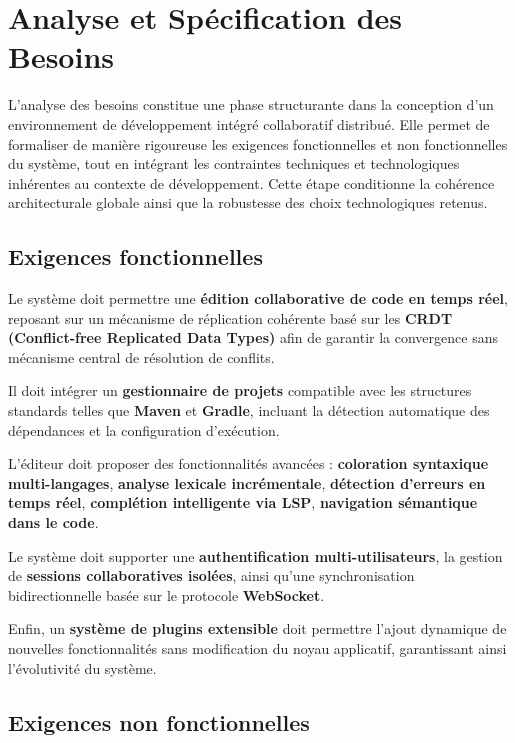 \documentclass[a4paper,oneside,12pt]{book}
\begin{document}
\chapter{\textbf{Analyse et Spécification des Besoins}}

L’analyse des besoins constitue une phase structurante dans la conception d’un environnement de développement intégré collaboratif distribué. Elle permet de formaliser de manière rigoureuse les exigences fonctionnelles et non fonctionnelles du système, tout en intégrant les contraintes techniques et technologiques inhérentes au contexte de développement. Cette étape conditionne la cohérence architecturale globale ainsi que la robustesse des choix technologiques retenus.

\section{\textbf{Exigences fonctionnelles}}

Le système doit permettre une \textbf{édition collaborative de code en temps réel}, reposant sur un mécanisme de réplication cohérente basé sur les \textbf{CRDT (Conflict-free Replicated Data Types)} afin de garantir la convergence sans mécanisme central de résolution de conflits.

Il doit intégrer un \textbf{gestionnaire de projets} compatible avec les structures standards telles que \textbf{Maven} et \textbf{Gradle}, incluant la détection automatique des dépendances et la configuration d’exécution.

L’éditeur doit proposer des fonctionnalités avancées :  
\textbf{coloration syntaxique multi-langages},  
\textbf{analyse lexicale incrémentale},  
\textbf{détection d’erreurs en temps réel},  
\textbf{complétion intelligente via LSP},  
\textbf{navigation sémantique dans le code}.

Le système doit supporter une \textbf{authentification multi-utilisateurs}, la gestion de \textbf{sessions collaboratives isolées}, ainsi qu’une synchronisation bidirectionnelle basée sur le protocole \textbf{WebSocket}.

Enfin, un \textbf{système de plugins extensible} doit permettre l’ajout dynamique de nouvelles fonctionnalités sans modification du noyau applicatif, garantissant ainsi l’évolutivité du système.
\section{\textbf{Exigences non fonctionnelles}}
\end{document}
